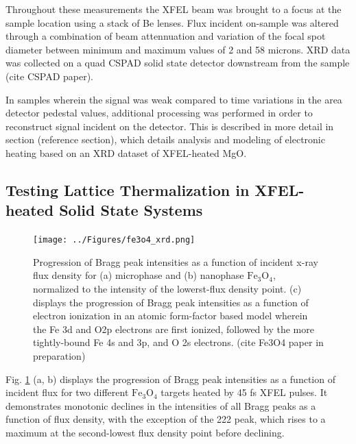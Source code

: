 \documentclass [11pt, proquest, article] {uwthesis}[2016/11/22]
\begin{document}
Throughout these measurements the XFEL beam was brought to a focus at the sample location using a stack of Be lenses. Flux incident on-sample was altered through a combination of beam attennuation and variation of the focal spot diameter between minimum and maximum values of 2 and 58 microns. XRD data was collected on a quad CSPAD solid state detector downstream from the sample (cite CSPAD paper).

In samples wherein the signal was weak compared to time variations in the area detector pedestal values, additional processing was performed in order to reconstruct signal incident on the detector. 
This is described in more detail in section (reference section), which details analysis and modeling of electronic heating based on an XRD dataset of XFEL-heated MgO.
 
\subsection{Testing Lattice Thermalization in XFEL-heated Solid State Systems}

\begin{figure}[h] 
\caption{Progression of Bragg peak intensities as a function of incident x-ray flux density for (a) microphase and (b) nanophase $\mathrm{Fe}_3\mathrm{O}_4$, normalized to the intensity of the lowerst-flux density point. (c) displays the progression of Bragg peak intensities as a function of electron ionization in an atomic form-factor based model wherein the Fe 3d and O2p electrons are first ionized, followed by the more tightly-bound Fe 4s and 3p, and O 2s electrons. (cite Fe3O4 paper in preparation)}
\centering
\texttt{[image: ../Figures/fe3o4\_xrd.png]}
\label{fexrd}
\end{figure}

Fig. \ref{fexrd} (a, b) displays the progression of Bragg peak intensities as a function of incident flux for two different $\mathrm{Fe}_3\mathrm{O}_4$ targets heated by 45 fs XFEL pulses. It demonstrates monotonic declines in the intensities of all Bragg peaks as a function of flux density, with the exception of the 222 peak, which rises to a maximum at the second-lowest flux density point before declining.
\end{document}
